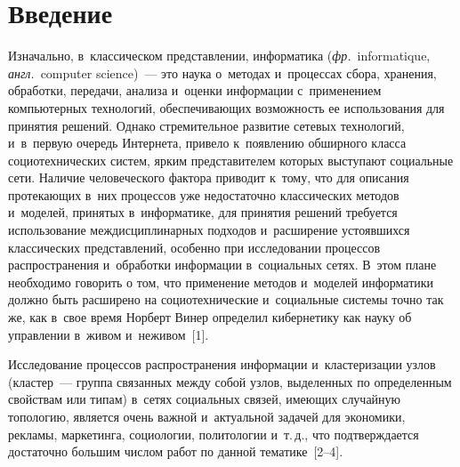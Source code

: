 
  
\vspace*{6pt}



\thispagestyle{headings}

\begin{multicols}{2}

\label{st\stat}

\section{Введение}

Изначально, в~классическом пред\-став\-ле\-нии, информатика (\textit{фр.}\ informatique, 
\textit{англ.}\ computer science)~--- это наука о~методах и~процессах сбора, хранения, 
обработки, передачи, анализа и~оценки информации с~применением 
компьютерных технологий, обеспечивающих воз\-мож\-ность ее использования 
для принятия решений. Однако стремительное развитие сетевых технологий, 
и~в~первую очередь Интернета, привело к~появлению обширного класса 
социотехнических сис\-тем, ярким пред\-ста\-ви\-те\-лем которых выступают 
социальные сети. Наличие человеческого фактора приводит к~тому, что для 
описания про\-те\-ка\-ющих в~них процессов уже недостаточно классических 
методов и~моделей, принятых в~информатике, для принятия решений требуется 
использование междисциплинарных подходов и~расширение усто\-яв\-ших\-ся 
классических пред\-став\-ле\-ний, особенно при исследовании процессов 
распространения и~обработки информации в~социальных сетях. В~этом плане 
необходимо говорить о том, что применение методов и~моделей информатики 
должно быть расширено на социотехнические и~социальные сис\-те\-мы точ\-но так 
же, как в~свое время Норберт Винер определил кибернетику как науку об 
управ\-ле\-нии в~живом и~неживом~[1]. 

  Исследование процессов распространения информации и~кластеризации 
узлов (клас\-тер~--- группа связанных между собой узлов, выделенных по 
определенным свойствам или типам) в~сетях социальных связей, име\-ющих 
случайную топологию, является очень важной и~актуальной задачей для 
экономики, рекламы, маркетинга, социологии, политологии и~т.\,д., что 
подтверждается достаточно большим чис\-лом работ по данной тематике~[2--4].
  

\end{multicols}
